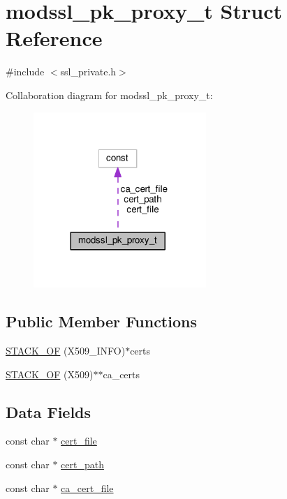 \hypertarget{structmodssl__pk__proxy__t}{}\section{modssl\+\_\+pk\+\_\+proxy\+\_\+t Struct Reference}
\label{structmodssl__pk__proxy__t}


{\ttfamily \#include $<$ssl\+\_\+private.\+h$>$}



Collaboration diagram for modssl\+\_\+pk\+\_\+proxy\+\_\+t\+:
\nopagebreak
\begin{figure}[H]
\begin{center}
\leavevmode
\includegraphics[width=185pt]{structmodssl__pk__proxy__t__coll__graph}
\end{center}
\end{figure}
\subsection*{Public Member Functions}
\begin{DoxyCompactItemize}
\item 
\hyperlink{structmodssl__pk__proxy__t_a2a053de182e3a3392c5e6c140ec88d51}{S\+T\+A\+C\+K\+\_\+\+OF} (X509\+\_\+\+I\+N\+FO)$\ast$certs
\item 
\hyperlink{structmodssl__pk__proxy__t_a1d212c2b540922f0b159c58da21cb1ac}{S\+T\+A\+C\+K\+\_\+\+OF} (X509)$\ast$$\ast$ca\+\_\+certs
\end{DoxyCompactItemize}
\subsection*{Data Fields}
\begin{DoxyCompactItemize}
\item 
const char $\ast$ \hyperlink{structmodssl__pk__proxy__t_a1641198cd22edd2f715964ee71dea901}{cert\+\_\+file}
\item 
const char $\ast$ \hyperlink{structmodssl__pk__proxy__t_aa92a13af4015ad4ac56abaec4c6f758b}{cert\+\_\+path}
\item 
const char $\ast$ \hyperlink{structmodssl__pk__proxy__t_a4e679824c7fb437c278c5915b248b770}{ca\+\_\+cert\+\_\+file}
\end{DoxyCompactItemize}


